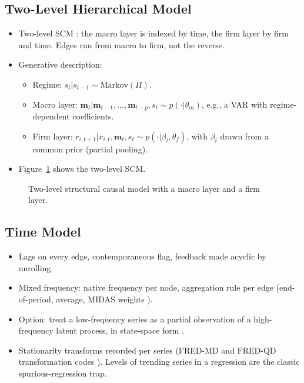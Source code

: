   \subsection{Two-Level Hierarchical Model}\label{sec:two_level_model}

  \begin{itemize}
  \tightlist
  \item
    Two-level SCM \cite{pearl2009causality}: the macro layer is indexed by
    time, the firm layer by firm and time. Edges run from macro to firm,
    not the reverse.
  \item
    Generative description:

    \begin{itemize}
    \tightlist
    \item
      Regime: \(s_t | s_{t-1} \sim \text{Markov}(\Pi)\).
    \item
      Macro layer: \(\mathbf{m}_t | \mathbf{m}_{t-1}, \dots,
      \mathbf{m}_{t-p}, s_t \sim p(\cdot | \theta_m)\), e.g., a VAR with
      regime-dependent coefficients.
    \item
      Firm layer: \(r_{i,t+1} | x_{i,t}, \mathbf{m}_t, s_t \sim
      p(\cdot | \beta_i, \theta_f)\), with \(\beta_i\) drawn from a common
      prior (partial pooling).
    \end{itemize}
  \item
    Figure~\ref{fig:two_level_scm} shows the two-level SCM.
  \end{itemize}

  \begin{figure}[H]
    \centering
    \caption{Two-level structural causal model with a macro layer and a firm
      layer.}
    \label{fig:two_level_scm}
  \end{figure}

  \subsection{Time Model}\label{sec:time_model}

  \begin{itemize}
  \tightlist
  \item
    Lags on every edge, contemporaneous flag, feedback made acyclic by
    unrolling.
  \item
    Mixed frequency: native frequency per node, aggregation rule per edge
    (end-of-period, average, MIDAS weights \cite{ghysels2007midas}).
  \item
    Option: treat a low-frequency series as a partial observation of a
    high-frequency latent process, in state-space form
    \cite{schorfheide2015real,mariano2003new}.
  \item
    Stationarity transforms recorded per series (FRED-MD and FRED-QD
    transformation codes \cite{mccracken2016fredmd,mccracken2021fredqd}).
    Levels of trending series in a regression are the classic
    spurious-regression trap.
  \end{itemize}

